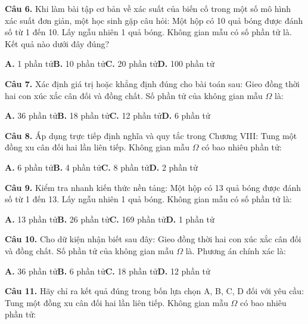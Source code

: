 \documentclass[11pt,a4paper]{article}
\begin{document}
\textbf{\color{primary} Câu 6.} Khi làm bài tập cơ bản về xác suất của biến cố trong một số mô hình xác suất đơn giản, một học sinh gặp câu hỏi: Một hộp có 10 quả bóng được đánh số từ 1 đến 10. Lấy ngẫu nhiên 1 quả bóng. Không gian mẫu có số phần tử là. Kết quả nào dưới đây đúng?\par
\hspace*{1.5em}\textbf{A.} 1 phần tử\quad\quad \textbf{B.} 10 phần tử\quad\quad \textbf{C.} 20 phần tử\quad\quad \textbf{D.} 100 phần tử\par\vspace{2pt}
\textbf{\color{primary} Câu 7.} Xác định giá trị hoặc khẳng định đúng cho bài toán sau: Gieo đồng thời hai con xúc xắc cân đối và đồng chất. Số phần tử của không gian mẫu $\Omega$ là:\par
\hspace*{1.5em}\textbf{A.} 36 phần tử\quad\quad \textbf{B.} 18 phần tử\quad\quad \textbf{C.} 12 phần tử\quad\quad \textbf{D.} 6 phần tử\par\vspace{2pt}
\textbf{\color{primary} Câu 8.} Áp dụng trực tiếp định nghĩa và quy tắc trong Chương VIII: Tung một đồng xu cân đối hai lần liên tiếp. Không gian mẫu $\Omega$ có bao nhiêu phần tử:\par
\hspace*{1.5em}\textbf{A.} 6 phần tử\quad\quad \textbf{B.} 4 phần tử\quad\quad \textbf{C.} 8 phần tử\quad\quad \textbf{D.} 2 phần tử\par\vspace{2pt}
\textbf{\color{primary} Câu 9.} Kiểm tra nhanh kiến thức nền tảng: Một hộp có 13 quả bóng được đánh số từ 1 đến 13. Lấy ngẫu nhiên 1 quả bóng. Không gian mẫu có số phần tử là:\par
\hspace*{1.5em}\textbf{A.} 13 phần tử\quad\quad \textbf{B.} 26 phần tử\quad\quad \textbf{C.} 169 phần tử\quad\quad \textbf{D.} 1 phần tử\par\vspace{2pt}
\textbf{\color{primary} Câu 10.} Cho dữ kiện nhận biết sau đây: Gieo đồng thời hai con xúc xắc cân đối và đồng chất. Số phần tử của không gian mẫu $\Omega$ là. Phương án chính xác là:\par
\hspace*{1.5em}\textbf{A.} 36 phần tử\quad\quad \textbf{B.} 6 phần tử\quad\quad \textbf{C.} 18 phần tử\quad\quad \textbf{D.} 12 phần tử\par\vspace{2pt}
\textbf{\color{primary} Câu 11.} Hãy chỉ ra kết quả đúng trong bốn lựa chọn A, B, C, D đối với yêu cầu: Tung một đồng xu cân đối hai lần liên tiếp. Không gian mẫu $\Omega$ có bao nhiêu phần tử:\par
\end{document}
